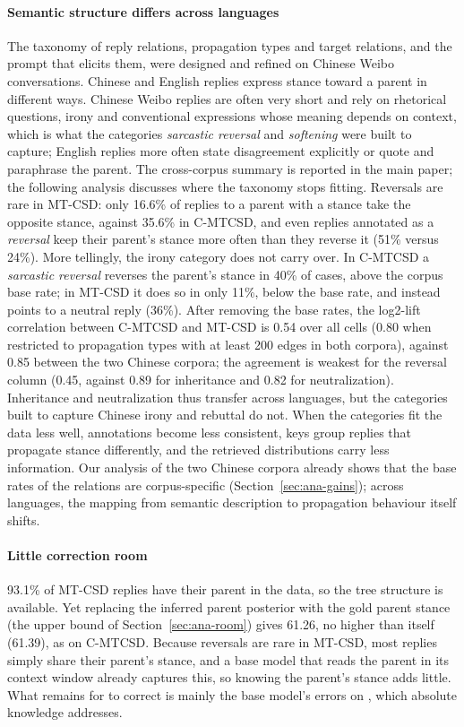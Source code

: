 \paragraph{Semantic structure differs across languages}
The taxonomy of reply relations, propagation types and target relations, and the prompt that elicits them, were designed and refined on Chinese Weibo conversations. Chinese and English replies express stance toward a parent in different ways. Chinese Weibo replies are often very short and rely on rhetorical questions, irony and conventional expressions whose meaning depends on context, which is what the categories \emph{sarcastic reversal} and \emph{softening} were built to capture; English replies more often state disagreement explicitly or quote and paraphrase the parent. The cross-corpus summary is reported in the main paper; the following analysis discusses where the taxonomy stops fitting. Reversals are rare in MT-CSD: only 16.6\% of replies to a parent with a stance take the opposite stance, against 35.6\% in C-MTCSD, and even replies annotated as a \emph{reversal} keep their parent's stance more often than they reverse it (51\% versus 24\%). More tellingly, the irony category does not carry over. In C-MTCSD a \emph{sarcastic reversal} reverses the parent's stance in 40\% of cases, above the corpus base rate; in MT-CSD it does so in only 11\%, below the base rate, and instead points to a neutral reply (36\%). After removing the base rates, the log2-lift correlation between C-MTCSD and MT-CSD is 0.54 over all cells (0.80 when restricted to propagation types with at least 200 edges in both corpora), against 0.85 between the two Chinese corpora; the agreement is weakest for the reversal column (0.45, against 0.89 for inheritance and 0.82 for neutralization). Inheritance and neutralization thus transfer across languages, but the categories built to capture Chinese irony and rebuttal do not. When the categories fit the data less well, annotations become less consistent, keys group replies that propagate stance differently, and the retrieved distributions carry less information. Our analysis of the two Chinese corpora already shows that the base rates of the relations are corpus-specific (Section~\ref{sec:ana-gains}); across languages, the mapping from semantic description to propagation behaviour itself shifts.


\paragraph{Little correction room}
93.1\% of MT-CSD replies have their parent in the data, so the tree structure is available. Yet replacing the inferred parent posterior with the gold parent stance (the upper bound of Section~\ref{sec:ana-room}) gives 61.26, no higher than \spin{} itself (61.39), as on C-MTCSD. Because reversals are rare in MT-CSD, most replies simply share their parent's stance, and a base model that reads the parent in its context window already captures this, so knowing the parent's stance adds little. What remains for \spin{} to correct is mainly the base model's errors on \nonelabel{}, which absolute knowledge addresses.

